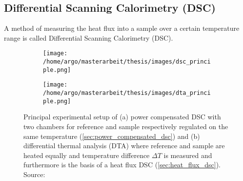 \documentclass{scrartcl}[12pt, halfparskip]
\numberwithin{equation}{section}
\numberwithin{figure}{section}
\numberwithin{table}{section}
\begin{document}
\subsection{Differential Scanning Calorimetry (DSC)}
\label{sec:physics_DSC}
A method of measuring the heat flux into a sample over a certain temperature range is called Differential Scanning Calorimetry (DSC). 

\begin{figure}[H]
	\centering
	\begin{subfigure}{0.49\textwidth}
		\texttt{[image: /home/argo/masterarbeit/thesis/images/dsc\_principle.png]}
		\caption{}
		\label{fig:DSC_power_compensated_principle}
	\end{subfigure}
	\begin{subfigure}{0.49\textwidth}
		\texttt{[image: /home/argo/masterarbeit/thesis/images/dta\_principle.png]}
		\caption{}
		\label{fig:DTA_principle}
	\end{subfigure}
	\caption{Principal experimental setup of (a) power compensated DSC with two chambers for reference and sample respectively regulated on the same temperature (\cref{sec:power_compensated_dsc}) and (b) differential thermal analysis (DTA) where reference and sample are heated equally and temperature difference $\Delta T$ is measured and furthermore is the basis of a heat flux DSC (\cref{sec:heat_flux_dsc}). Source: \cite{DSC_buch}}
\end{figure}
\end{document}
